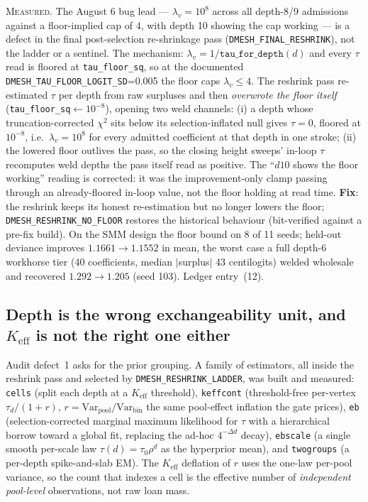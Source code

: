 \textsc{Measured.} The August 6 bug lead --- $\lambda_v=10^8$ across all
depth-8/9 admissions against a floor-implied cap of $4$, with depth 10 showing
the cap working --- is a defect in the final post-selection re-shrinkage pass
(\texttt{DMESH\_FINAL\_RESHRINK}), not the ladder or a sentinel. The mechanism:
$\lambda_v=1/\texttt{tau\_for\_depth}(d)$ and every $\tau$ read is floored at
\texttt{tau\_floor\_sq}, so at the documented
\texttt{DMESH\_TAU\_FLOOR\_LOGIT\_SD}=0.005 the floor caps $\lambda_v\le4$. The
reshrink pass re-estimated $\tau$ per depth from raw surpluses and then
\emph{overwrote the floor itself} (\texttt{tau\_floor\_sq}$\leftarrow10^{-8}$),
opening two weld channels: (i) a depth whose truncation-corrected $\chi^2$ sits
below its selection-inflated null gives $\tau=0$, floored at $10^{-8}$, i.e.\
$\lambda_v=10^8$ for every admitted coefficient at that depth in one stroke;
(ii) the lowered floor outlives the pass, so the closing height sweeps'
in-loop $\tau$ recomputes weld depths the pass itself read as positive. The
``$d10$ shows the floor working'' reading is corrected: it was the
improvement-only clamp passing through an already-floored in-loop value, not
the floor holding at read time. \textbf{Fix}: the reshrink keeps its honest
re-estimation but no longer lowers the floor;
\texttt{DMESH\_RESHRINK\_NO\_FLOOR} restores the historical behaviour
(bit-verified against a pre-fix build). On the SMM design the floor bound on 8
of 11 seeds; held-out deviance improves $1.1661\to1.1552$ in mean, the worst
case a full depth-6 workhorse tier (40 coefficients, median $|$surplus$|$ 43
centilogits) welded wholesale and recovered $1.292\to1.205$ (seed 103).
Ledger entry~(12).

\subsection{Depth is the wrong exchangeability unit, and $K_{\mathrm{eff}}$ is
not the right one either}\label{sec:aug12-ladder}

Audit defect~1 asks for the prior grouping. A family of estimators, all inside
the reshrink pass and selected by \texttt{DMESH\_RESHRINK\_LADDER}, was built
and measured: \texttt{cells} (split each depth at a $K_{\mathrm{eff}}$
threshold), \texttt{keffcont} (threshold-free per-vertex
$\tau_d/(1+r)$, $r=\mathrm{Var}_{\mathrm{pool}}/\mathrm{Var}_{\mathrm{bin}}$
the same pool-effect inflation the gate prices), \texttt{eb}
(selection-corrected marginal maximum likelihood for $\tau$ with a hierarchical
borrow toward a global fit, replacing the ad-hoc $4^{-\Delta d}$ decay),
\texttt{ebscale} (a single smooth per-scale law $\tau(d)=\tau_0\rho^d$ as the
hyperprior mean), and \texttt{twogroups} (a per-depth spike-and-slab EM). The
$K_{\mathrm{eff}}$ deflation of $r$ uses the one-law per-pool variance, so the
count that indexes a cell is the effective number of \emph{independent
pool-level} observations, not raw loan mass.

